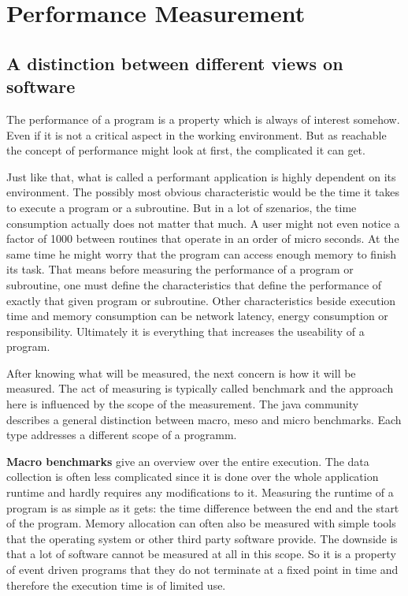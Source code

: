 \section{Performance Measurement}
\label{benchmarking}
\subsection{A distinction between different views on software}
The performance of a program is a property which is always of interest somehow. Even if it is not a critical aspect in the working environment. But as reachable the concept of performance might look at first, the complicated it can get.

Just like that, what is called a performant application is highly dependent on its environment. The possibly most obvious characteristic would be the time it takes to execute a program or a subroutine. But in a lot of szenarios, the time consumption actually does not matter that much. A user might not even notice a factor of 1000 between routines that operate in an order of micro seconds. At the same time he might worry that the program can access enough memory to finish its task. That means before measuring the performance of a program or subroutine, one must define the characteristics that define the performance of exactly that given program or subroutine. Other characteristics beside execution time and memory consumption can be network latency, energy consumption or responsibility. Ultimately it is everything that increases the useability of a program.

After knowing what will be measured, the next concern is how it will be measured. The act of measuring is typically called benchmark and the approach here is influenced by the scope of the measurement. The java community describes a general distinction between macro, meso and micro benchmarks\cite{oaks2014java}. Each type addresses a different scope of a programm.

\textbf{Macro benchmarks} give an overview over the entire execution. The data collection is often less complicated since it is done over the whole application runtime and hardly requires any modifications to it. Measuring the runtime of a program is as simple as it gets: the time difference between the end and the start of the program. Memory allocation can often also be measured with simple tools that the operating system or other third party software provide. The downside is that a lot of software cannot be measured at all in this scope. So it is a property of event driven programs that they do not terminate at a fixed point in time and therefore the execution time is of limited use.


